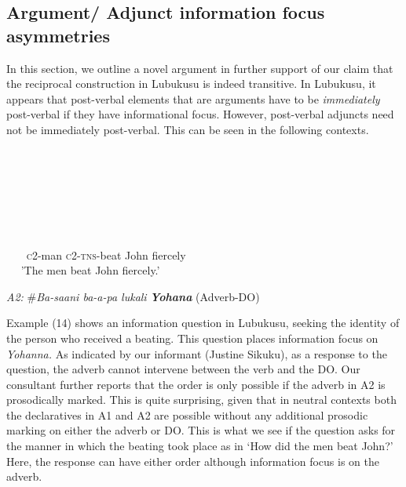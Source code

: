 \subsection{Argument/ Adjunct information focus asymmetries}

  In this section, we outline a novel argument in further support of our claim that the reciprocal construction in Lubukusu is indeed transitive. In Lubukusu, it appears that post-verbal elements that are arguments have to be \textit{immediately} post-verbal if they have informational focus. However, post-verbal adjuncts need not be immediately post-verbal. This can be seen in the following contexts.

\setcounter{listWWviiiNumxlileveli}{0}
\begin{listWWviiiNumxlileveli}
\item \ea\label{ex:}
\\
\ea\label{ex:}
\\
\ea\label{ex:}
\\
\ea\label{ex:}
\\
\end{listWWviiiNumxlileveli}
\begin{listWWviiiNumxlileveli}
\ea\label{ex:}
\\
\end{listWWviiiNumxlileveli}
     ~~~   \textsc{c}2-man   \textsc{c2-tns}{}-beat   John     fiercely\\
~~   'The men beat John fiercely.'
\z

\glt \textit{A2:  }\#\textit{Ba-saani  ba-a-pa  lukali    }\textbf{\textit{Yohana}}  (Adverb-DO)  
\z

Example (14) shows an information question in Lubukusu, seeking the identity of the person who received a beating. This question places information focus on \textit{Yohanna.} As indicated by our informant (Justine Sikuku), as a response to the question, the adverb cannot intervene between the verb and the DO. Our consultant further reports that the order is only possible if the adverb in A2 is prosodically marked. This is quite surprising, given that in neutral contexts both the declaratives in A1 and A2 are possible without any additional prosodic marking on either the adverb or DO. This is what we see if the question asks for the manner in which the beating took place as in ‘How did the men beat John?’ Here, the response can have either order although information focus is on the adverb. 

